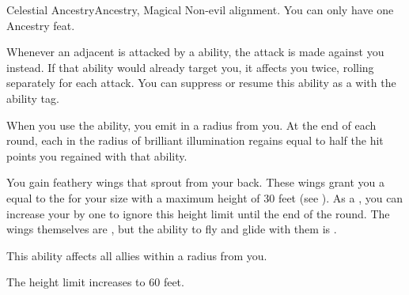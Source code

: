     \begin{magicalfeat}{Celestial Ancestry}{Ancestry, Magical}
        \featpre Non-evil alignment.
         You can only have one Ancestry feat.

         Whenever an adjacent  is attacked by a  ability, the attack is made against you instead.
        If that ability would already target you, it affects you twice, rolling separately for each attack.
        You can suppress or resume this ability as a  with the  ability tag.

         When you use the  ability, you  emit  in a \largearea radius  from you.
        At the end of each round, each  in the radius of brilliant illumination regains  equal to half the hit points you regained with that  ability.

         You gain feathery wings that sprout from your back.
        These wings grant you a  equal to the  for your size with a maximum height of 30 feet (see ).
        As a , you can increase your  by one to ignore this height limit until the end of the round.
        The wings themselves are , but the ability to fly and glide with them is \magical.

         This ability affects all allies within a \medarea radius  from you.

         The height limit increases to 60 feet.
    \end{magicalfeat}

